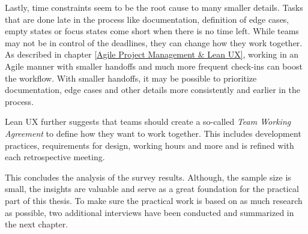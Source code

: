 Lastly, time constraints seem to be the root cause to many smaller details. Tasks that are done late
in the process like documentation, definition of edge cases, empty states or focus states come short
when there is no time left. While teams may not be in control of the deadlines, they can change how
they work together. As described in chapter \ref{Agile Project Management & Lean UX}, working in an
Agile manner with smaller handoffs and much more frequent check-ins can boost the workflow. With
smaller handoffs, it may be possible to prioritize documentation, edge cases and other details more
consistently and earlier in the process.

Lean UX further suggests that teams should create a so-called \textit{Team Working Agreement} to
define how they want to work together. This includes development practices, requirements for design,
working hours and more and is refined with each retrospective meeting.

This concludes the analysis of the survey results. Although, the sample size is small, the insights
are valuable and serve as a great foundation for the practical part of this thesis. To make sure the
practical work is based on as much research as possible, two additional interviews have been
conducted and summarized in the next chapter.
